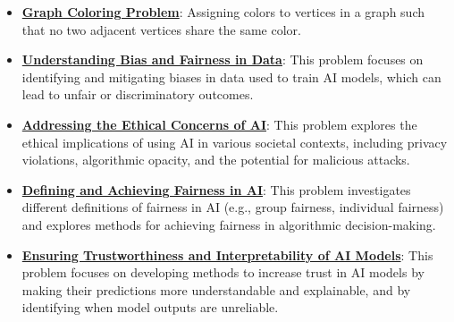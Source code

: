 \documentclass{article}%
\begin{document}
\begin{itemize}[leftmargin=*]
\item \href{https://purdue.brightspace.com/d2l/common/assets/pdfjs-d2l-dist/1.0.14-legacy/web/viewer.html?file=\%2Fcontent\%2Fenforced\%2F1095467-wl.202510.CS.24300.001\%2F15L2-SAT.pdf\%3Fou\%3D1095467\&lang=en-us\&container=d2l-fileviewer-rendered-pdf\&fullscreen=d2l-fileviewer-rendered-pdf-dialog\&height=667#page=47}{\textbf{Graph Coloring Problem}}: Assigning colors to vertices in a graph such that no two adjacent vertices share the same color.%
\end{itemize}%
\begin{itemize}[leftmargin=*]%
\item \href{https://purdue.brightspace.com/d2l/common/assets/pdfjs-d2l-dist/1.0.14-legacy/web/viewer.html?file=\%2Fcontent\%2Fenforced\%2F1095467-wl.202510.CS.24300.001\%2F16L2-ethics.pdf\%3Fou\%3D1095467\&lang=en-us\&container=d2l-fileviewer-rendered-pdf\&fullscreen=d2l-fileviewer-rendered-pdf-dialog\&height=667#page=2}{\textbf{Understanding Bias and Fairness in Data}}: This problem focuses on identifying and mitigating biases in data used to train AI models, which can lead to unfair or discriminatory outcomes.%
\item \href{https://purdue.brightspace.com/d2l/common/assets/pdfjs-d2l-dist/1.0.14-legacy/web/viewer.html?file=\%2Fcontent\%2Fenforced\%2F1095467-wl.202510.CS.24300.001\%2F16L2-ethics.pdf\%3Fou\%3D1095467\&lang=en-us\&container=d2l-fileviewer-rendered-pdf\&fullscreen=d2l-fileviewer-rendered-pdf-dialog\&height=667#page=2}{\textbf{Addressing the Ethical Concerns of AI}}: This problem explores the ethical implications of using AI in various societal contexts, including privacy violations, algorithmic opacity, and the potential for malicious attacks.%
\item \href{https://purdue.brightspace.com/d2l/common/assets/pdfjs-d2l-dist/1.0.14-legacy/web/viewer.html?file=\%2Fcontent\%2Fenforced\%2F1095467-wl.202510.CS.24300.001\%2F16L2-ethics.pdf\%3Fou\%3D1095467\&lang=en-us\&container=d2l-fileviewer-rendered-pdf\&fullscreen=d2l-fileviewer-rendered-pdf-dialog\&height=667#page=19}{\textbf{Defining and Achieving Fairness in AI}}: This problem investigates different definitions of fairness in AI (e.g., group fairness, individual fairness) and explores methods for achieving fairness in algorithmic decision-making.%
\item \href{https://purdue.brightspace.com/d2l/common/assets/pdfjs-d2l-dist/1.0.14-legacy/web/viewer.html?file=\%2Fcontent\%2Fenforced\%2F1095467-wl.202510.CS.24300.001\%2F16L2-ethics.pdf\%3Fou\%3D1095467\&lang=en-us\&container=d2l-fileviewer-rendered-pdf\&fullscreen=d2l-fileviewer-rendered-pdf-dialog\&height=667#page=28}{\textbf{Ensuring Trustworthiness and Interpretability of AI Models}}: This problem focuses on developing methods to increase trust in AI models by making their predictions more understandable and explainable, and by identifying when model outputs are unreliable.%
\end{itemize}
\end{document}
